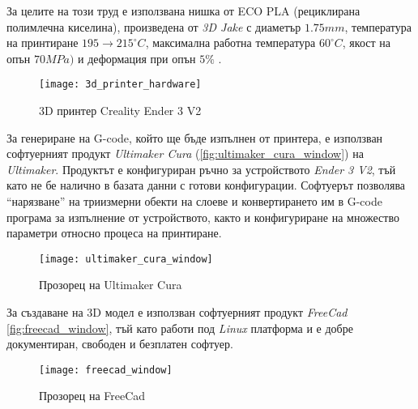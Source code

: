 За целите на този труд е използвана нишка от ECO PLA (рециклирана полимлечна киселина), произведена от \textit{3D Jake} 
с диаметър \(1.75mm\),
температура на принтиране \(195\to215^{\circ}C\), 
максимална работна температура \(60^{\circ}C\),
якост на опън \(70MPa)\)
и деформация при опън \(5\%\) \cite{datasheet_ecopla}.

\begin{figure}[htpb!]
    \centering
    \texttt{[image: 3d\_printer\_hardware]}
    \caption{3D принтер Creality Ender 3 V2}
    \label{fig:3d_printer_hardware}
\end{figure}

\FloatBarrier
За генериране на G-code, който ще бъде изпълнен от принтера, е използван софтуерният продукт
\textit{Ultimaker Cura} (\autoref{fig:ultimaker_cura_window}) на \textit{Ultimaker}.
Продуктът е конфигуриран ръчно за устройството \textit{Ender 3 V2}, тъй като не бе налично
в базата данни с готови конфигурации. 
Софтуерът позволява \enquote{нарязване} на триизмерни обекти на слоеве и конвертирането им в G-code програма за изпълнение от
устройството, както и конфигуриране на множество параметри относно процеса на принтиране.

\begin{figure}[htpb!]
    \centering
    \texttt{[image: ultimaker\_cura\_window]}
    \caption{Прозорец на Ultimaker Cura}
    \label{fig:ultimaker_cura_window}
\end{figure}
\FloatBarrier
За създаване на 3D модел е използван софтуерният продукт \textit{FreeCad} \autoref{fig:freecad_window},
тъй като работи под \textit{Linux} платформа и е добре документиран, свободен и безплатен софтуер.

\begin{figure}[htpb!]
    \centering
    \texttt{[image: freecad\_window]}
    \caption{Прозорец на FreeCad}
    \label{fig:freecad_window}
\end{figure}

\FloatBarrier




